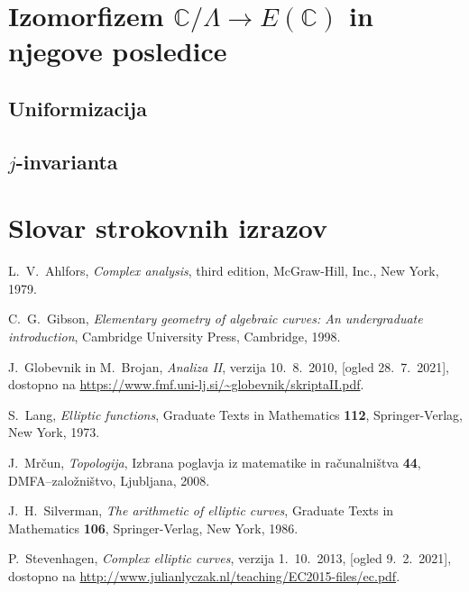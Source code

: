 \documentclass[mat1]{fmfdelo}
\newcommand{\C}{\mathbb C}
\theoremstyle{definition}
\begin{document}
\section{Izomorfizem \texorpdfstring{$\C/\Lambda \to E(\C)$}{} in njegove posledice} \label{poglavje izomorfizem}

\subsection{Uniformizacija}

\begin{izrek}
    \label{uniformizacija}
\end{izrek}

\subsection{$j$-invarianta}
 

\break

\section*{Slovar strokovnih izrazov}

\geslo{}{}
\geslo{}{}


\begin{thebibliography}{99}
    
        L.~V.~Ahlfors, \emph{Complex analysis}, third edition, McGraw-Hill, Inc., New York, 1979.

        C.~G.~Gibson, \emph{Elementary geometry of algebraic curves: An undergraduate introduction}, Cambridge University Press, Cambridge, 1998.

        J.~Globevnik in M.~Brojan, \emph{Analiza II}, verzija 10.~8.~2010, [ogled 28.~7.~2021], dostopno na \url{https://www.fmf.uni-lj.si/~globevnik/skriptaII.pdf}.
    
        S.~Lang, \emph{Elliptic functions}, Graduate Texts in Mathematics \textbf{112}, Springer-Verlag, New York, 1973.

        J.~Mrčun, \emph{Topologija}, Izbrana poglavja iz matematike in računalništva \textbf{44}, DMFA--založništvo, Ljubljana, 2008.
    
        J.~H.~Silverman, \emph{The arithmetic of elliptic curves}, Graduate Texts in Mathematics \textbf{106}, Springer-Verlag, New York, 1986.

        P.~Stevenhagen, \emph{Complex elliptic curves}, verzija 1.~10.~2013, [ogled 9.~2.~2021], dostopno na \url{http://www.julianlyczak.nl/teaching/EC2015-files/ec.pdf}.
    
\end{thebibliography}
\end{document}

